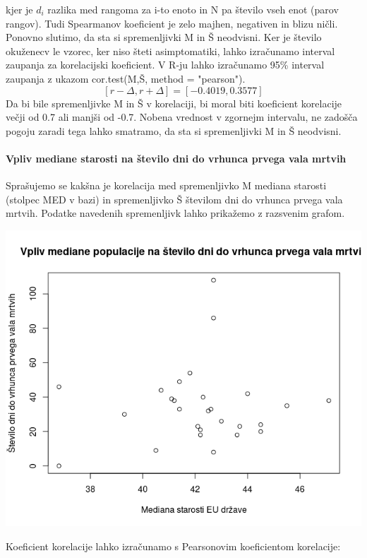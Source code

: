 \documentclass[a4paper,11pt]{article}
\begin{document}
kjer je \( d_i \) razlika med rangoma za i-to enoto in N pa število vseh enot (parov rangov). Tudi Spearmanov koeficient je zelo majhen, negativen in blizu ničli. Ponovno slutimo, da sta si spremenljivki M in Š neodvisni.
Ker je število okuženecv le vzorec, ker niso šteti asimptomatiki, lahko izračunamo interval zaupanja za korelacijski koeficient. V R-ju lahko izračunamo 95\% interval zaupanja z ukazom cor.test(M,Š, method = "pearson").
\[[r - \Delta, r + \Delta] = [-0.4019, 0.3577]\]
Da bi bile spremenljivke M in Š v korelaciji, bi moral biti koeficient korelacije večji od 0.7 ali manjši od -0.7. Nobena vrednost v zgornejm intervalu, ne zadošča pogoju zaradi tega lahko smatramo, da sta si spremenljivki M in Š neodvisni.

\paragraph{Vpliv mediane starosti na število dni do vrhunca prvega vala mrtvih}
Sprašujemo se kakšna je korelacija med spremenljivko M mediana starosti (stolpec MED v bazi) in spremenljivko Š številom dni do vrhunca prvega vala mrtvih. Podatke navedenih spremenljivk lahko prikažemo z razsvenim grafom.
\\
\begin{center}
\includegraphics[scale=0.6]{vpliv_med_pop_na_st_dni_do_peaka_mrtvih}\\
\end{center}
Koeficient korelacije lahko izračunamo s Pearsonovim koeficientom korelacije:
\end{document}
